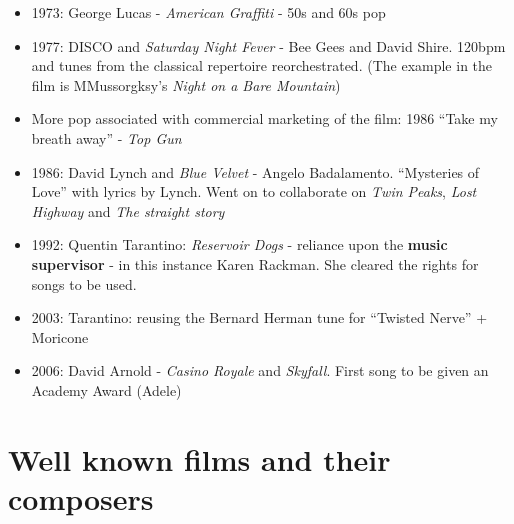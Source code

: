 \begin{itemize}
\item 1973: George Lucas - \textit{American Graffiti} - 50s and 60s pop
\item 1977: DISCO and \textit{Saturday Night Fever} - Bee Gees and David Shire. 120bpm and tunes from the classical repertoire reorchestrated. (The example in the film is MMussorgksy's \textit{Night on a Bare Mountain})
\item More pop associated with commercial marketing of the film: 1986 ``Take my breath away'' - \textit{Top Gun}
\item 1986: David Lynch and \textit{Blue Velvet} - Angelo Badalamento. ``Mysteries of Love'' with lyrics by Lynch. Went on to collaborate on \textit{Twin Peaks}, \textit{Lost Highway} and \textit{The straight story}
\item 1992: Quentin Tarantino: \textit{Reservoir Dogs} - reliance upon the \textbf{music supervisor} - in this instance Karen Rackman. She cleared the rights for songs to be used.
\item 2003: Tarantino: reusing the Bernard Herman tune for ``Twisted Nerve'' + Moricone
\item 2006: David Arnold - \textit{Casino Royale} and \textit{Skyfall}. First song to be given an Academy Award (Adele)
 
\end{itemize}

\section{Well known films and their composers}
 
